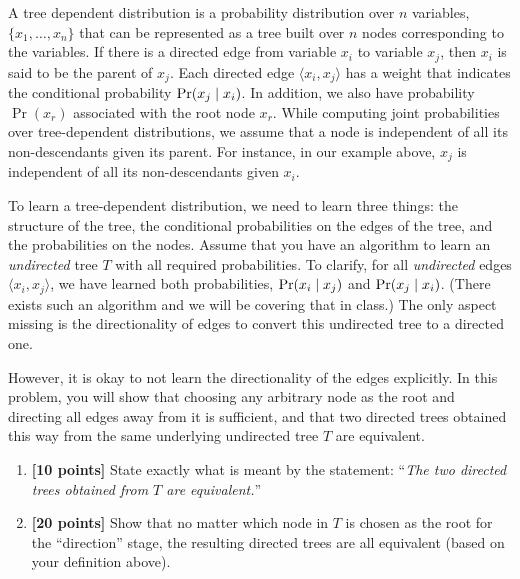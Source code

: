 \begin{enumerate}
      A tree dependent distribution is a probability distribution over $n$
      variables, $\{x_1,\ldots,x_n\}$ that can be represented as a tree built
      over $n$ nodes corresponding to the variables. If there is a directed edge
      from variable $x_i$ to variable $x_j$, then $x_i$ is said to be the parent
      of $x_j$. Each directed edge $\langle x_i, x_j\rangle$ has a weight that
      indicates the conditional probability $\Pr(x_j \;|\; x_i)$. In addition,
      we also have probability $\Pr(x_r)$ associated with the root node $x_r$.
      While computing joint probabilities over tree-dependent distributions, we
      assume that a node is independent of all its non-descendants given its
      parent. For instance, in our example above, $x_j$ is independent of all its
      non-descendants given $x_i$.

      To learn a tree-dependent distribution, we need to learn three things: the
      structure of the tree, the conditional probabilities on the edges of the tree, and the
      probabilities on the nodes.  Assume that you have an algorithm to learn an
      {\em undirected} tree $T$ with all required probabilities. To clarify, for
      all {\em undirected} edges $\langle x_i, x_j\rangle$, we have learned both
      probabilities, $\Pr(x_i \;|\; x_j)$ and $\Pr(x_j \;|\; x_i)$.
      (There exists such an algorithm and we will be covering that in class.) The
      only aspect missing is the directionality of edges to convert this
      undirected tree to a directed one.

      However, it is okay to not learn the directionality of the edges explicitly. In
      this problem, you will show that choosing any arbitrary node as the root
      and directing all edges away from it is sufficient, and that two directed
      trees obtained this way from the same underlying undirected tree $T$ are
      equivalent.

      \begin{enumerate}
        \item {\bf [10 points]}
          State exactly what is meant by the statement: ``\emph{The two directed trees
          obtained from $T$ are equivalent.}''

        \item {\bf [20 points]}
          Show that no matter which node in $T$ is chosen as the root for the
          ``direction'' stage, the resulting directed trees are all equivalent (based
          on your definition above).

      \end{enumerate}

  \end{enumerate}
  
